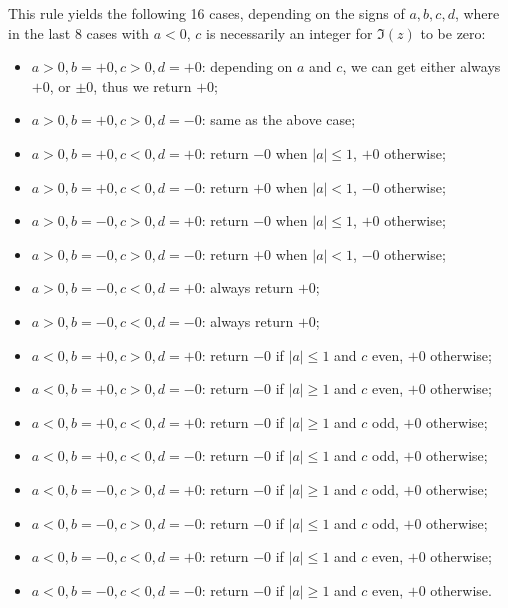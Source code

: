 \documentclass [11pt]{article}
\begin{document}
This rule yields the following 16 cases, depending on the signs of
$a, b, c, d$, where in the last 8 cases with $a < 0$, $c$ is necessarily an
integer for $\Im(z)$ to be zero:
\begin{itemize}
\item $a > 0, b = +0, c > 0, d = +0$: depending on $a$ and $c$,
  we can get either always $+0$, or $\pm 0$, thus we return $+0$;
\item $a > 0, b = +0, c > 0, d = -0$: same as the above case;
\item $a > 0, b = +0, c < 0, d = +0$: return $-0$ when $|a|\le 1$,
  $+0$ otherwise;
\item $a > 0, b = +0, c < 0, d = -0$: return $+0$ when $|a| < 1$,
  $-0$ otherwise;
\item $a > 0, b = -0, c > 0, d = +0$: return $-0$ when $|a| \le 1$,
  $+0$ otherwise;
\item $a > 0, b = -0, c > 0, d = -0$: return $+0$ when $|a| < 1$,
  $-0$ otherwise;
\item $a > 0, b = -0, c < 0, d = +0$: always return $+0$;
\item $a > 0, b = -0, c < 0, d = -0$: always return $+0$;
\item $a < 0, b = +0, c > 0, d = +0$: return $-0$ if $|a| \le 1$ and
  $c$ even, $+0$ otherwise;
\item $a < 0, b = +0, c > 0, d = -0$: return $-0$ if $|a| \ge 1$ and
  $c$ even, $+0$ otherwise;
\item $a < 0, b = +0, c < 0, d = +0$: return $-0$ if $|a| \ge 1$ and
  $c$ odd, $+0$ otherwise;
\item $a < 0, b = +0, c < 0, d = -0$: return $-0$ if $|a| \le 1$ and
  $c$ odd, $+0$ otherwise;
\item $a < 0, b = -0, c > 0, d = +0$: return $-0$ if $|a| \ge 1$ and
  $c$ odd, $+0$ otherwise;
\item $a < 0, b = -0, c > 0, d = -0$: return $-0$ if $|a| \le 1$ and
  $c$ odd, $+0$ otherwise;
\item $a < 0, b = -0, c < 0, d = +0$: return $-0$ if $|a| \le 1$ and
  $c$ even, $+0$ otherwise;
\item $a < 0, b = -0, c < 0, d = -0$: return $-0$ if $|a| \ge 1$ and
  $c$ even, $+0$ otherwise.
\end{itemize}
\end{document}
